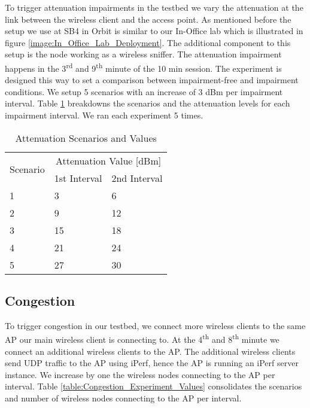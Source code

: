 To trigger attenuation impairments in the testbed we vary the attenuation at the link between the wireless client and the access point. As mentioned before the setup we use at SB4 in Orbit is similar to our In-Office lab which is illustrated in figure \ref{image:In_Office_Lab_Deployment}. The additional component to this setup is the node working as a wireless sniffer. The attenuation impairment happens in the 3\textsuperscript{rd} and 9\textsuperscript{th} minute of the 10 min session. The experiment is designed this way to set a comparison between impairment-free and impairment conditions. We setup 5 scenarios with an increase of 3 dBm per impairment interval. Table \ref{table:Attenuation_Experiment_Values} breakdowns the scenarios and the attenuation levels for each impairment interval. We ran each experiment 5 times.

\begin{table}[h!]
	\begin{center}
		\begin{tabular}{|| m{5em} | m{2cm}| m{2cm} ||}
			\hline
			\multirow{2}{*}{Scenario} & \multicolumn{2}{c||}{Attenuation Value {[}dBm{]}} \\ \cline{2-3} 
			& \multicolumn{1}{l|}{1st Interval} & \multicolumn{1}{l||}{2nd Interval} \\ \hline\hline
			1 & 3 & 6 \\ \hline
			2 & 9 & 12 \\ \hline
			3 & 15 & 18 \\ \hline
			4 & 21 & 24 \\ \hline
			5 & 27 & 30 \\ \hline
		\end{tabular}
	\end{center}
	\caption{Attenuation Scenarios and Values}
	\label{table:Attenuation_Experiment_Values}
\end{table}

\subsection*{Congestion}\label{congestion}

To trigger congestion in our testbed, we connect more wireless clients to the same AP our main wireless client is connecting to. At the 4\textsuperscript{th} and 8\textsuperscript{th} minute we connect an additional wireless clients to the AP. The additional wireless clients send UDP traffic to the AP using iPerf, hence the AP is running an iPerf server instance. We increase by one the wireless nodes connecting to the AP per interval. Table \ref{table:Congestion_Experiment_Values} consolidates the scenarios and number of wireless nodes connecting to the AP per interval.

